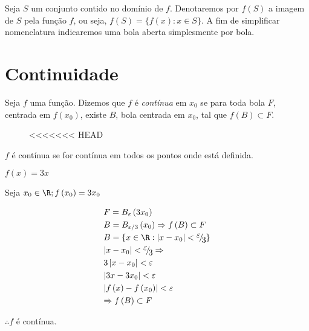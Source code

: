 \documentclass{book}
\begin{document}
Seja $S$ um conjunto contido no domínio de $f$. Denotaremos por $f(S)$ a
imagem de $S$ pela função $f$, ou seja, $f(S)=\big\{f(x): x\in
S\big\}$. A fim de simplificar nomenclatura indicaremos uma bola aberta
simplesmente por bola.

\section{Continuidade}\label{revcalc:cont}
\begin{defi}
  Seja $f$ uma função. Dizemos que $f$ é
  \emph{contínua} em $x_0$ se para toda bola $F$,
  centrada em $f(x_0)$, existe $B$, bola centrada em $x_0$, tal que
  $f(B)\subset F$.
\end{defi}

\begin{figure}[!h]
  \centering
<<<<<<< HEAD
  \quad
\end{figure}

\begin{defn}
$f$ \'e cont\'inua se for cont\'inua em todos os pontos onde est\'a definida.
\end{defn}

\begin{ex}
$f(x) = 3x$
\end{ex}

\begin{sol}
Seja $x_0  \in \R;f\left( {x_0 } \right) = 3x_0$

\[
\begin{gathered}
F = B_\varepsilon  \left( {3x_0 } \right) \hfill \\
B = B_{\varepsilon /3} \left( {x_0 } \right) \Rightarrow f\left( B \right) \subset F \hfill \\
B = \left\{ {x \in \R:\left| {x - x_0 } \right| < {\raise0.7ex\hbox{$\varepsilon $} \!\mathord{\left/
{\vphantom {\varepsilon  3}}\right.\kern-\nulldelimiterspace}
\!\lower0.7ex\hbox{$3$}}} \right\} \hfill \\
\left| {x - x_0 } \right| < {\raise0.7ex\hbox{$\varepsilon $} \!\mathord{\left/
{\vphantom {\varepsilon  3}}\right.\kern-\nulldelimiterspace}
\!\lower0.7ex\hbox{$3$}} \Rightarrow  \hfill \\
3\left| {x - x_0 } \right| < \varepsilon  \hfill \\
\left| {3x - 3x_0 } \right| < \varepsilon  \hfill \\
\left| {f\left( x \right) - f\left( {x_0 } \right)} \right| < \varepsilon  \hfill \\
\Rightarrow f\left( B \right) \subset F \hfill \\
\end{gathered}
\]

$\therefore f$ \'e cont\'inua.
\end{sol}
\end{document}
